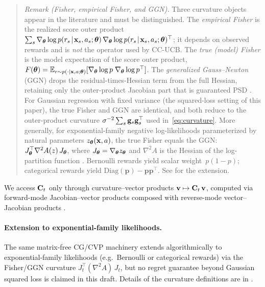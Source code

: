 \documentclass[twoside]{article}
\begin{document}
\begin{quote}\small
\emph{Remark (Fisher, empirical Fisher, and GGN).}
Three curvature objects appear in the literature and must be
distinguished.
The \emph{empirical Fisher} is the realized score outer product
$\sum_s\nabla_{\boldsymbol{\theta}}\log p(r_s\!\mid\!\mathbf{x}_s,a_s;\boldsymbol{\theta})\,
 \nabla_{\boldsymbol{\theta}}\log p(r_s\!\mid\!\mathbf{x}_s,a_s;\boldsymbol{\theta})^\top$;
it depends on observed rewards and is \emph{not} the operator used by
CC-UCB.
The \emph{true (model) Fisher} is the model expectation of the score
outer product,
$F(\boldsymbol{\theta})=\mathbb{E}_{r\sim p(\cdot\mid\mathbf{x},a;\boldsymbol{\theta})}
 [\nabla_{\boldsymbol{\theta}}\log p\;\nabla_{\boldsymbol{\theta}}\log p^\top]$.
The \emph{generalized Gauss--Newton} (GGN) drops the
residual-times-Hessian term from the full Hessian, retaining only the
outer-product Jacobian part that is guaranteed PSD
\citep{martens2020new,schraudolph2002fast}.
For Gaussian regression with fixed variance (the squared-loss setting
of this paper), the true Fisher and GGN are identical, and both
reduce to the outer-product curvature $\sigma^{-2}\sum_s\mathbf{g}_s\mathbf{g}_s^\top$
used in~\eqref{eq:curvature}.
More generally, for exponential-family negative log-likelihoods
parameterized by natural parameters $z_{\boldsymbol{\theta}}(\mathbf{x},a)$, the true
Fisher equals the GGN:
$J_{\boldsymbol{\theta}}^\top\nabla^2 A(z)\,J_{\boldsymbol{\theta}}$,
where $J_{\boldsymbol{\theta}}=\nabla_{\boldsymbol{\theta}}z_{\boldsymbol{\theta}}$ and
$\nabla^2 A$ is the Hessian of the log-partition function
\citep{martens2020new,pascanu2014revisiting}.
Bernoulli rewards yield scalar weight~$p(1{-}p)$;
categorical rewards yield $\mathrm{Diag}(\mathbf{p})-\mathbf{p}\mathbf{p}^\top$.
See  for the extension.
\end{quote}

We access $\mathbf{C}_t$ only through curvature--vector products
$\mathbf{v}\mapsto\mathbf{C}_t\,\mathbf{v}$, computed via forward-mode Jacobian--vector
products composed with reverse-mode vector--Jacobian products
\citep{pearlmutter1994fast,schraudolph2002fast}.



\paragraph{Extension to exponential-family likelihoods.}%
The same matrix-free CG/CVP machinery extends algorithmically to
exponential-family likelihoods (e.g.\ Bernoulli or categorical rewards)
via the Fisher/GGN curvature $J_t^\top(\nabla^2 A)\,J_t$, but no regret
guarantee beyond Gaussian squared loss is claimed in this draft.
Details of the curvature definitions are in .
\end{document}
